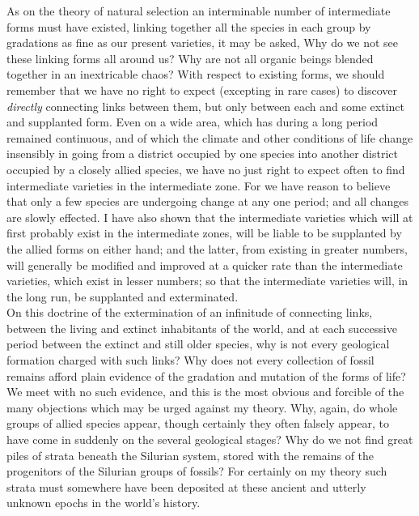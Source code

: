 \indent As on the theory of natural selection an interminable number of intermediate forms must have existed, linking together all the species in each group by gradations as fine as our present varieties, it may be asked, Why do we not see these linking forms all around us? Why are not all organic beings blended together in an inextricable chaos? With respect to existing forms, we should remember that we have no right to expect (excepting in rare cases) to discover \emph{directly} connecting links between them, but only between each and some extinct and supplanted form. Even on a wide area, which has during a long period remained continuous, and of which the climate and other conditions of life change insensibly in going from a district occupied by one species into another district occupied by a closely allied species, we have no just right to expect often to find intermediate varieties in the intermediate zone. For we have reason to believe that only a few species are undergoing change at any one period; and all changes are slowly effected. I have also shown that the intermediate varieties which will at first probably exist in the intermediate zones, will be liable to be supplanted by the allied forms on either hand; and the latter, from existing in greater numbers, will generally be modified and improved at a quicker rate than the intermediate varieties, which exist in lesser numbers; so that the intermediate varieties will, in the long run, be supplanted and exterminated.~\\
\indent On this doctrine of the extermination of an infinitude of connecting links, between the living and extinct inhabitants of the world, and at each successive period between the extinct and still older species, why is not every geological formation charged with such links? Why does not every collection of fossil remains afford plain evidence of the gradation and mutation of the forms of life? We meet with no such evidence, and this is the most obvious and forcible of the many objections which may be urged against my theory. Why, again, do whole groups of allied species appear, though certainly they often falsely appear, to have come in suddenly on the several geological stages? Why do we not find great piles of strata beneath the Silurian system, stored with the remains of the progenitors of the Silurian groups of fossils? For certainly on my theory such strata must somewhere have been deposited at these ancient and utterly unknown epochs in the world's history.~\\
